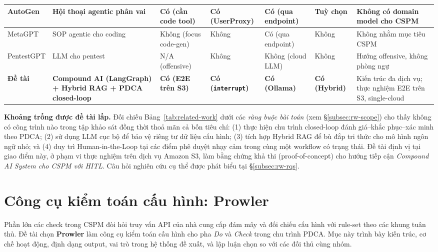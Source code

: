 \begin{table}[!htb]
\begin{tabular}{|p{2.6cm}|p{2.6cm}|>{\centering\arraybackslash}p{1.4cm}|>{\centering\arraybackslash}p{0.9cm}|>{\centering\arraybackslash}p{1.0cm}|>{\centering\arraybackslash}p{0.9cm}|p{3.0cm}|}
    AutoGen \cite{microsoft2023autogen} & Hội thoại agentic phân vai & Có (cần code tool) & Có (UserProxy) & Có (qua endpoint) & Tuỳ chọn & Không có domain model cho CSPM \\ \hline
    MetaGPT \cite{hong2024metagpt} & SOP agentic cho coding & Không (focus code-gen) & Không & Có (qua endpoint) & Không & Không nhằm mục tiêu CSPM \\ \hline
    PentestGPT \cite{deng2024pentestgpt} & LLM cho pentest & N/A (offensive) & Không & Không (cloud LLM) & Không & Hướng offensive, không phòng ngự \\ \hline
    \textbf{Đề tài} & \textbf{Compound AI (LangGraph) + Hybrid RAG + PDCA closed-loop} & \textbf{Có (E2E trên S3)} & \textbf{Có (\texttt{interrupt})} & \textbf{Có (Ollama)} & \textbf{Có (Hybrid)} & Kiến trúc đa dịch vụ; thực nghiệm E2E trên S3, single-cloud \\ \hline
  \end{tabular}
\end{table}

\noindent\textbf{Khoảng trống được đề tài lấp.} Đối chiếu Bảng~\ref{tab:related-work} dưới các \textit{ràng buộc bài toán} (xem §\ref{subsec:rw-scope}) cho thấy không có công trình nào trong tập khảo sát đồng thời thoả mãn cả bốn tiêu chí: (1) thực hiện chu trình closed-loop đánh giá--khắc phục--xác minh theo PDCA; (2) sử dụng LLM cục bộ để bảo vệ riêng tư dữ liệu cấu hình; (3) tích hợp Hybrid RAG để bù đắp tri thức cho mô hình ngôn ngữ nhỏ; và (4) duy trì Human-in-the-Loop tại các điểm phê duyệt nhạy cảm trong cùng một workflow có trạng thái. Đề tài định vị tại giao điểm này, ở phạm vi thực nghiệm trên dịch vụ Amazon S3, làm bằng chứng khả thi (proof-of-concept) cho hướng tiếp cận \textit{Compound AI System cho CSPM với HITL}. Câu hỏi nghiên cứu cụ thể được phát biểu tại §\ref{subsec:rw-rqs}.

\section{Công cụ kiểm toán cấu hình: Prowler}
\label{sec:prowler-tool}

Phần lớn các check trong CSPM đòi hỏi truy vấn API của nhà cung cấp đám mây và đối chiếu cấu hình với rule-set theo các khung tuân thủ. Đề tài chọn \textbf{Prowler} \cite{prowler} làm công cụ kiểm toán cấu hình cho pha \textit{Do} và \textit{Check} trong chu trình PDCA. Mục này trình bày kiến trúc, cơ chế hoạt động, định dạng output, vai trò trong hệ thống đề xuất, và lập luận chọn so với các đối thủ cùng nhóm.

